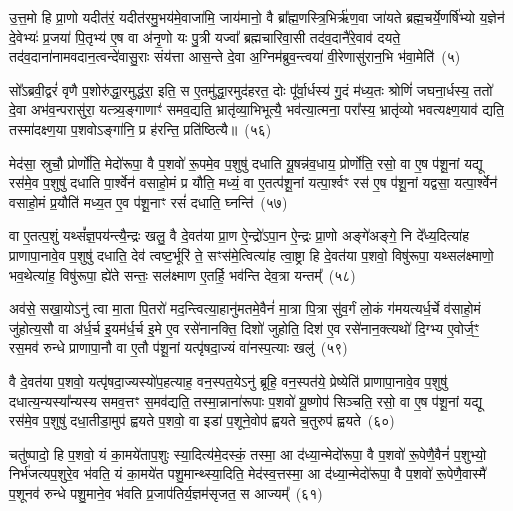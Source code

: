 उ॒त्त॒मो हि प्रा॒णो यदीत॑रं॒ यदीत॑रमु॒भय॑मे॒वाजा॑मि॒ जाय॑मानो॒ वै ब्रा᳚ह्म॒णस्त्रि॒भिर्\mbox{}ऋ॑ण॒वा जा॑यते ब्रह्म॒चर्ये॒णर्\mbox{}षि॑भ्यो य॒ज्ञेन॑ दे॒वेभ्यः॑ प्र॒जया॑ पि॒तृभ्य॑ ए॒ष वा अ॑नृ॒णो यः पु॒त्री यज्वा᳚ ब्रह्मचारिवा॒सी तद॑व॒दानै॑रे॒वाव॑ दयते॒ तद॑व॒दाना॑नामवदान॒त्वन्दे॑वासु॒राः संय॑त्ता आस॒न्ते दे॒वा अ॒ग्निम॑ब्रुव॒न्त्वया॑ वी॒रेणासु॑रान॒भि भ॑वा॒मेति॑~(५)

सो᳚\-ऽब्रवी॒द्वरं॑ वृणै प॒शोरु॑द्धा॒रमुद्ध॑रा॒ इति॒ स ए॒तमु॑द्धा॒रमुद॑हरत॒ दोः पू᳚र्वा॒र्धस्य॑ गु॒दं म॑ध्य॒तः श्रोणिं॑ जघना॒र्धस्य॒ ततो॑ दे॒वा अभ॑व॒न्परासु॑रा॒ यत्त्र्य॒ङ्गाणाꣳ॑ समव॒द्यति॒ भ्रातृ॑व्या॒भिभूत्यै॒ भव॑त्या॒त्मना॒ परा᳚स्य॒ भ्रातृ॑व्यो भवत्यक्ष्ण॒याव॑ द्यति॒ तस्मा॑दक्ष्ण॒या प॒शवो\-ऽङ्गा॑नि॒ प्र ह॑रन्ति॒ प्रति॑ष्ठित्यै॥~(५६)

{\anuvakamend[{ए॒तौ प॑शू॒नाꣳ समे॑धस्यै॒व तस्यावो᳚त्त॒मस्याव॑ द्य॒तीति॒ पञ्च॑चत्वारिꣳशच्च}]}%

मेद॑सा॒ स्रुचौ॒ प्रोर्णो॑ति॒ मेदो॑रूपा॒ वै प॒शवो॑ रू॒पमे॒व प॒शुषु॑ दधाति यू॒षन्न॑व॒धाय॒ प्रोर्णो॑ति॒ रसो॒ वा ए॒ष प॑शू॒नां यद्यू रस॑मे॒व प॒शुषु॑ दधाति पा॒र्श्वेन॑ वसाहो॒मं प्र यौ॑ति॒ मध्यं॒ वा ए॒तत्प॑शू॒नां यत्पा॒र्श्वꣳ रस॑ ए॒ष प॑शू॒नां यद्वसा॒ यत्पा॒र्श्वेन॑ वसाहो॒मं प्र॒यौति॑ मध्य॒त ए॒व प॑शू॒नाꣳ रसं॑ दधाति॒ घ्नन्ति॑~(५७)

वा ए॒तत्प॒शुं यथ्सं᳚ज्ञ॒पय॑न्त्यै॒न्द्रः खलु॒ वै दे॒वत॑या प्रा॒ण ऐ॒न्द्रो॑\-ऽपा॒न ऐ॒न्द्रः प्रा॒णो अङ्गे॑अङ्गे॒ नि दे᳚ध्य॒दित्या॑ह प्राणापा॒नावे॒व प॒शुषु॑ दधाति॒ देव॑ त्वष्ट॒र्भूरि॑ ते॒ सꣳस॑मे॒त्वित्या॑ह त्वा॒ष्ट्रा हि दे॒वत॑या प॒शवो॒ विषु॑रूपा॒ यथ्सल॑क्ष्माणो॒ भव॒थेत्या॑ह॒ विषु॑रूपा॒ ह्ये॑ते सन्तः॒ सल॑क्ष्माण ए॒तर्\mbox{}हि॒ भव॑न्ति देव॒त्रा यन्तम्᳚~(५८)

अव॑से॒ सखा॒यो\-ऽनु॑ त्वा मा॒ता पि॒तरो॑ मद॒न्त्वित्या॒हानु॑मतमे॒वैनं॑ मा॒त्रा पि॒त्रा सु॑व॒र्गं लो॒कं ग॑मयत्यर्ध॒र्चे व॑साहो॒मं जु॑होत्य॒सौ वा अ॑र्ध॒र्च इ॒यम॑र्ध॒र्च इ॒मे ए॒व रसे॑नानक्ति॒ दिशो॑ जुहोति॒ दिश॑ ए॒व रसे॑नान॒क्त्यथो॑ दि॒ग्भ्य ए॒वोर्ज॒ꣳ॒ रस॒मव॑ रुन्धे प्राणापा॒नौ वा ए॒तौ प॑शू॒नां यत्पृ॑षदा॒ज्यं वा॑नस्प॒त्याः खलु॑~(५९)

वै दे॒वत॑या प॒शवो॒ यत्पृ॑षदा॒ज्यस्यो॑प॒हत्याह॒ वन॒स्पत॒ये\-ऽनु॑ ब्रूहि॒ वन॒स्पत॑ये॒ प्रेष्येति॑ प्राणापा॒नावे॒व प॒शुषु॑ दधात्य॒न्यस्या᳚न्यस्य समव॒त्तꣳ स॒मव॑द्यति॒ तस्मा॒न्नाना॑रूपाः प॒शवो॑ यू॒ष्णोप॑ सिञ्चति॒ रसो॒ वा ए॒ष प॑शू॒नां यद्यू रस॑मे॒व प॒शुषु॑ दधा॒तीडा॒मुप॑ ह्वयते प॒शवो॒ वा इडा॑ प॒शूने॒वोप॑ ह्वयते च॒तुरुप॑ ह्वयते~(६०)

चतु॑ष्पादो॒ हि प॒शवो॒ यं का॒मये॑ताप॒शुः स्या॒दित्य॑मे॒दस्कं॒ तस्मा॒ आ द॑ध्या॒न्मेदो॑रूपा॒ वै प॒शवो॑ रू॒पेणै॒वैनं॑ प॒शुभ्यो॒ निर्भ॑जत्यप॒शुरे॒व भ॑वति॒ यं का॒मये॑त पशु॒मान्थ्स्या॒दिति॒ मेद॑स्व॒त्तस्मा॒ आ द॑ध्या॒न्मेदो॑रूपा॒ वै प॒शवो॑ रू॒पेणै॒वास्मै॑ प॒शूनव॑ रुन्धे पशु॒माने॒व भ॑वति प्र॒जा\-प॑तिर्य॒ज्ञम॑सृजत॒ स आज्यम्᳚~(६१)

